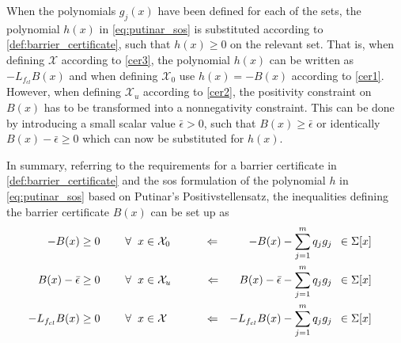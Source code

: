 When the polynomials $g_j(x)$ have been defined for each of the sets, the polynomial $h(x)$ in \autoref{eq:putinar_sos} is substituted according to \autoref{def:barrier_certificate}, such that $h(x)\geq 0$ on the relevant set. That is, when defining $\mathcal{X}$ according to \autoref{cer3}, the polynomial $h(x)$ can be written as $-L_{f_{cl}}B(x)$ and when defining $\mathcal{X}_0$ use $h(x)=-B(x)$ according to \autoref{cer1}. However, when defining $\mathcal{X}_u$ according to \autoref{cer2}, the positivity constraint on $B(x)$ has to be transformed into a nonnegativity constraint. This can be done by introducing a small scalar value $\bar{\epsilon}>0$, such that $B(x)\geq \bar{\epsilon} $ or identically $B(x)-\bar{\epsilon}\geq 0$ which can now be substituted for $h(x)$.

\begin{defn}\label{def:barrier_sos}
In summary, referring to the requirements for a barrier certificate in \autoref{def:barrier_certificate} and the \gls{sos} formulation of the polynomial $h$ in \autoref{eq:putinar_sos} based on Putinar's Positivstellensatz, the inequalities defining the barrier certificate $B(x)$ can be set up as
\vspace{-2mm}
\begin{subequations}\label{eq:barrier_constraints_putinar}
\begin{flalign}
&&	-B(x) &\geq 0 \hspace{0.8cm}  \forall \hspace{2mm} x \in \mathcal{X}_0 \qquad\quad \Leftarrow& 	-B(x) - \sum _{j=1}^{m}q_jg_j &\,\,\,\in \Sigma[x] &&& \label{cer1_putinar}\\
&&	B(x)-\bar{\epsilon} &\geq 0 \hspace{0.8cm}  \forall \hspace{2mm} x \in \mathcal{X}_u \qquad\quad \Leftarrow& 	B(x)-\bar{\epsilon} - \sum _{j=1}^{m}q_jg_j &\,\,\,\in \Sigma[x] &&&\label{cer2_putinar} \\
&&	-L_{f_{cl}}B(x) &\geq 0 \hspace{0.8cm}  \forall \hspace{2mm} x \in \mathcal{X} \qquad\quad\,\, \Leftarrow& 	-L_{f_{cl}}B(x) - \sum _{j=1}^{m}q_jg_j &\,\,\,\in \Sigma[x] &&& \label{cer3_putinar}
\end{flalign}
\end{subequations}
\end{defn}

